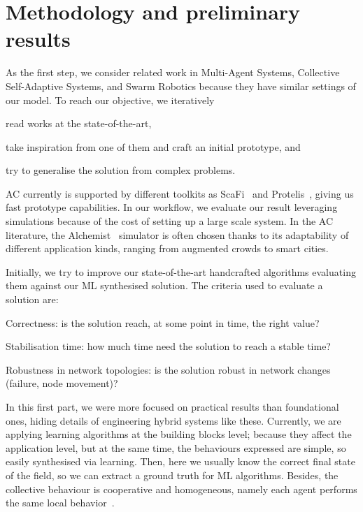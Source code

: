 \documentclass[conference]{IEEEtran}
\begin{document}
\section{Methodology and preliminary results}
%
As the first step, we consider related work in Multi-Agent Systems, Collective Self-Adaptive Systems, and Swarm Robotics because they have similar settings of our model.
To reach our objective, we iteratively 
\begin{enumerate*}[label=(\roman*)]
\item read works at the state-of-the-art,
\item take inspiration from one of them and craft an initial prototype, and
\item try to generalise the solution from complex problems.
\end{enumerate*}
AC currently is supported by different toolkits as ScaFi~\cite{DBLP:conf/ecoop/CasadeiV16} and Protelis~\cite{DBLP:conf/sac/PianiniVB15}, giving us fast prototype capabilities.
%
In our workflow, we evaluate our result leveraging simulations because of the cost of setting up a large scale system.
%
In the AC literature, the Alchemist~\cite{alchemist-jos2013} simulator is often chosen thanks to its adaptability of different application kinds, ranging from augmented crowds to smart cities.

Initially, we try to improve our state-of-the-art handcrafted algorithms evaluating them against our ML synthesised solution.
%
The criteria used to evaluate a solution are:
\begin{enumerate*}[label=(\roman*)]
    \item Correctness: is the solution reach, at some point in time, the right value?
    \item Stabilisation time: how much time need the solution to reach a stable time?
    \item Robustness in network topologies: is the solution robust in network changes (failure, node movement)?
\end{enumerate*}
%
In this first part, we were more focused on practical results than foundational ones, hiding details of engineering hybrid systems like these.  
%
Currently, we are applying learning algorithms at the building blocks level; because they affect the application level, but at the same time, the behaviours expressed are simple, so easily synthesised via learning.
%
Then, here we usually know the correct final state of the field, so we can extract a ground truth for ML algorithms.
%
Besides, the collective behaviour is cooperative and homogeneous, namely each agent performs the same local behavior~\cite{DBLP:journals/aamas/PanaitL05}.  %
\end{document}
